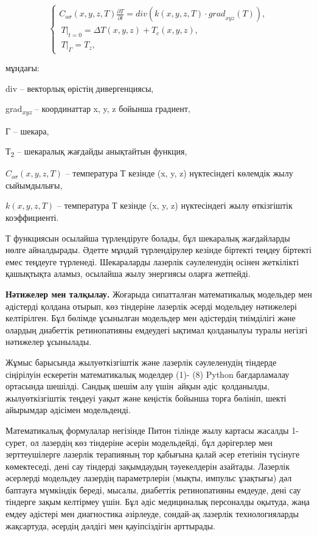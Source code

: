 \begin{equation}
\left\{ \begin{matrix}
C_{o\sigma}(x,y,z,T)\frac{\partial T}{\partial t} = div\left( k(x,y,z,T) \cdot {grad}_{xyz}(T) \right), \\
\left. \ T \right|_{t = 0} = \Delta T(x,y,z) + T_{c}(x,y,z), \\
\left. \ T \right|_{\Gamma} = T_{z},
\end{matrix} \right.
\end{equation}

\begin{multicols}{2}
мұндағы:

div -- векторлық өрістің дивергенциясы,

grad\emph{\textsubscript{xyz}} -- координаттар x, y, z бойынша градиент,

Г -- шекара,

Т\textsubscript{2} -- шекаралық жағдайды анықтайтын функция,

\(C_{o\sigma}(x,y,z,T)\) -- температура Т кезінде (x, y, z) нүктесіндегі
көлемдік жылу сыйымдылығы,

\(k(x,y,z,T)\) -- температура Т кезінде (x, y, z) нүктесіндегі жылу
өткізгіштік коэффициенті.

Т функциясын осылайша түрлендіруге болады, бұл шекаралық жағдайларды
нөлге айналдырады. Әдетте мұндай түрлендірулер кезінде біртекті теңдеу
біртекті емес теңдеуге түрленеді. Шекараларды лазерлік сәулеленудің
осінен жеткілікті қашықтықта аламыз, осылайша жылу энергиясы оларға
жетпейді.

{\bfseries Нәтижелер мен талқылау.} Жоғарыда сипатталған математикалық
модельдер мен әдістерді қолдана отырып, көз тіндеріне лазерлік әсерді
модельдеу нәтижелері келтірілген. Бұл бөлімде ұсынылған модельдер мен
әдістердің тиімділігі және олардың диабеттік ретинопатияны емдеудегі
ықтимал қолданылуы туралы негізгі нәтижелер ұсынылады.

Жұмыс барысында жылуөткізгіштік және лазерлік сәулеленудің тіндерде
сіңірілуін ескеретін математикалық моделдер (1)- (8) Python
бағдарламалау ортасында шешілді. Сандық шешім алу үшін~айқын
әдіс~қолданылды, жылуөткізгіштік теңдеуі уақыт және кеңістік бойынша
торға бөлініп, шекті айырымдар әдісімен модельденді.

Математикалық формулалар негізінде Питон тілінде жылу картасы жасалды
1-сурет, ол лазердің көз тіндеріне әсерін модельдейді, бұл дәрігерлер
мен зерттеушілерге лазерлік терапияның тор қабығына қалай әсер ететінін
түсінуге көмектеседі, дені сау тіндерді зақымдаудың тәуекелдерін
азайтады. Лазерлік әсерлерді модельдеу лазердің параметрлерін (мықты,
импульс ұзақтығы) дәл баптауға мүмкіндік береді, мысалы, диабеттік
ретинопатияны емдеуде, дені сау тіндерге зақым келтірмеу үшін. Бұл әдіс
медициналық персоналды оқытуда, жаңа емдеу әдістері мен диагностика
әзірлеуде, сондай-ақ лазерлік технологияларды жақсартуда, әсердің
дәлдігі мен қауіпсіздігін арттырады.
\end{multicols}


